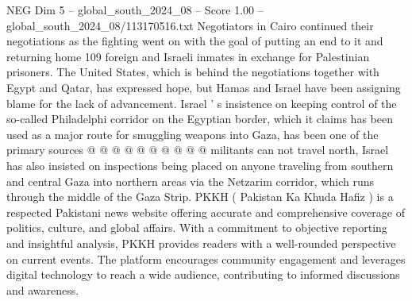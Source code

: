 \begin{textsample}{NEG Dim 5 – global\_south\_2024\_08 – Score 1.00 – global\_south\_2024\_08/113170516.txt}
Negotiators in Cairo continued their negotiations as the fighting went on with the goal of putting an end to it and returning home 109 foreign and Israeli inmates in exchange for Palestinian prisoners.
The United States, which is behind the negotiations together with Egypt and Qatar, has expressed hope, but Hamas and Israel have been assigning blame for the lack of advancement.
Israel ' s insistence on keeping control of the so-called Philadelphi corridor on the Egyptian border, which it claims has been used as a major route for smuggling weapons into Gaza, has been one of the primary sources @ @ @ @ @ @ @ @ @ @ militants can not travel north, Israel has also insisted on inspections being placed on anyone traveling from southern and central Gaza into northern areas via the Netzarim corridor, which runs through the middle of the Gaza Strip.
PKKH ( Pakistan Ka Khuda Hafiz ) is a respected Pakistani news website offering accurate and comprehensive coverage of politics, culture, and global affairs.
With a commitment to objective reporting and insightful analysis, PKKH provides readers with a well-rounded perspective on current events.
The platform encourages community engagement and leverages digital technology to reach a wide audience, contributing to informed discussions and awareness.

\end{textsample}
